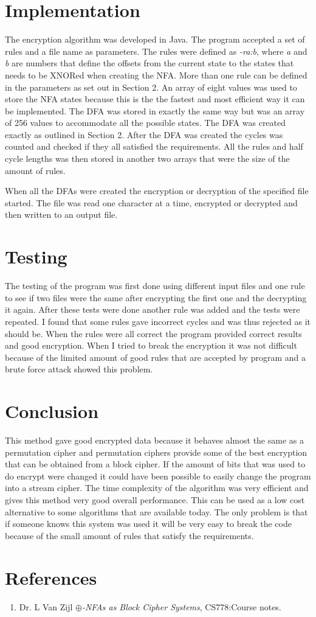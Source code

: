 \documentclass[a4paper,11pt,titlepage]{article}
\begin{document}
\section{Implementation}
The encryption algorithm was developed in Java. The program accepted a set of rules and a file name as parameters. The rules were defined as \emph{-ra:b}, where \emph{a} and \emph{b} are numbers that define the offsets from the current state to the states that needs to be XNORed when creating the NFA. More than one rule can be defined in the parameters as set out in Section 2. An array of eight values was used to store the NFA states because this is the the fastest and most efficient way it can be implemented. The DFA was stored in exactly the same way but was an array of 256 values to accommodate all the possible states. The DFA was created exactly as outlined in Section 2. After the DFA was created the cycles was counted and checked if they all satisfied the requirements. All the rules and half cycle lengths was then stored in another two arrays that were the size of the amount of rules.

When all the DFAs were created the encryption or decryption of the specified file started. The file was read one character at a time, encrypted or decrypted and then written to an output file.
\section{Testing}
The testing of the program was first done using different input files and one rule to see if two files were the same after encrypting the first one and the decrypting it again. After these tests were done another rule was added and the tests were repeated. I found that some rules gave incorrect cycles and was thus rejected as it should be. When the rules were all correct the program provided correct results and good encryption. When I tried to break the encryption it was not difficult because of the limited amount of good rules that are accepted by program and a brute force attack showed this problem.
\section{Conclusion}
This method gave good encrypted data because it behaves almost the same as a permutation cipher and permutation ciphers provide some of the best encryption that can be obtained from a block cipher. If the amount of bits that was used to do encrypt were changed it could have been possible to easily change the program into a stream cipher. The time complexity of the algorithm was very efficient and gives this method very good overall performance. This can be used as a low cost alternative to some algorithms that are available today. The only problem is that if someone knows this system was used it will be very easy to break the code because of the small amount of rules that satisfy the requirements.
\section{References}
\begin{enumerate}
\item Dr. L Van Zijl
\emph{$\oplus$-NFAs as Block Cipher Systems}, CS778:Course notes.
\end{enumerate}
\end{document}
